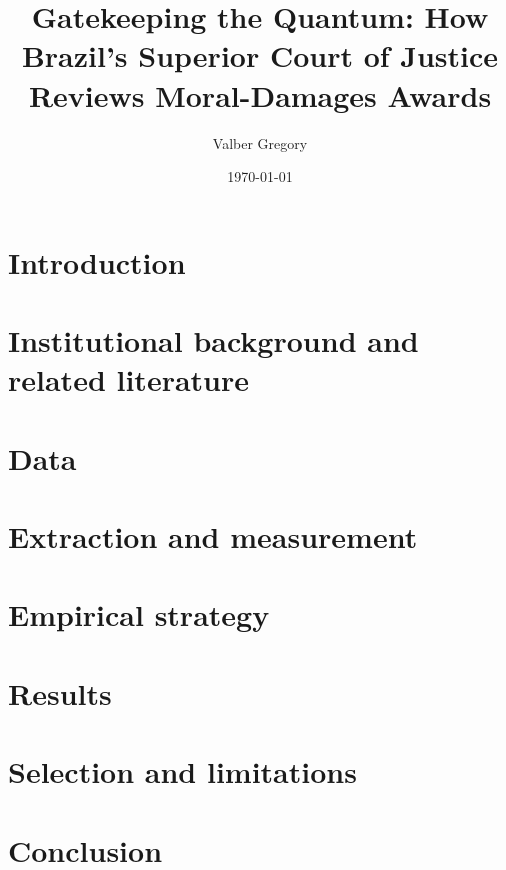 \documentclass[12pt]{article}
\title{Gatekeeping the Quantum: How Brazil's Superior Court of Justice Reviews Moral-Damages Awards} %
\author{Valber Gregory}
\date{\today}
\begin{document}
\maketitle

\begin{abstract}
\end{abstract}

\section{Introduction}

\section{Institutional background and related literature}

\section{Data}

\section{Extraction and measurement}

\section{Empirical strategy}

\section{Results}


\section{Selection and limitations}

\section{Conclusion}






\end{document}
